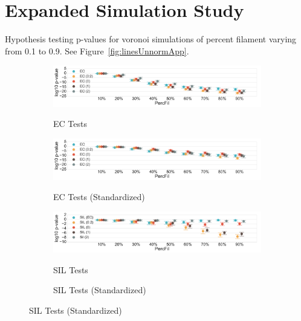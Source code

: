 \documentclass[12pt]{article}
\newcommand{\figref}[1]{Figure~\ref{#1}}
\begin{document}

\appendix


\section{Expanded Simulation Study} \label{app:simulation}

Hypothesis testing p-values for voronoi simulations of percent filament varying from 0.1 to 0.9. See \figref{fig:linesUnnormApp}.

  \begin{center}
    \begin{figure}[htp!]
      \centering
      \begin{subfigure}{.48\textwidth}
        \centering
        \caption{EC Tests}
        \includegraphics[width=\linewidth, height = .75in]{figure_8_all_euler_group.pdf}
        \label{fig:all_euler}
      \end{subfigure}
      \begin{subfigure}{.48\textwidth}
        \centering
        \caption{EC Tests (Standardized)}
        \includegraphics[width=\linewidth, height = .75in]{figure_8_all_euler_group_normed.pdf}
        \label{fig:all_euler_normed}
      \end{subfigure}
      \begin{subfigure}{.48\textwidth}
        \centering
        \caption{SIL Tests}
        \includegraphics[width=\linewidth, height = .75in]{figure_8_all_silhouette_group.pdf}
        \label{fig:all_silh}
      \end{subfigure}
      \begin{subfigure}{.48\textwidth}
        \centering
        \caption{SIL Tests (Standardized)}

\end{subfigure}
\end{figure}
\end{center}
\end{document}
